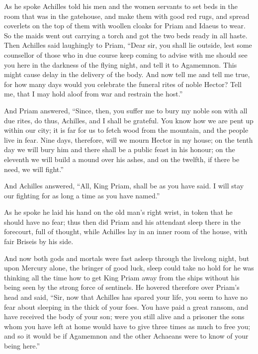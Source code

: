 As he spoke Achilles told his men and the women servants to set beds in
the room that was in the gatehouse, and make them with good red rugs, and
spread coverlets on the top of them with woollen cloaks for Priam and
Idaeus to wear. So the maids went out carrying a torch and got the two
beds ready in all haste. Then Achilles said laughingly to Priam, “Dear
sir, you shall lie outside, lest some counsellor of those who in due
course keep coming to advise with me should see you here in the darkness
of the flying night, and tell it to Agamemnon. This might cause delay in
the delivery of the body. And now tell me and tell me true, for how many
days would you celebrate the funeral rites of noble Hector? Tell me, that
I may hold aloof from war and restrain the host.”

And Priam answered, “Since, then, you suffer me to bury my noble son with
all due rites, do thus, Achilles, and I shall be grateful. You know how we
are pent up within our city; it is far for us to fetch wood from the
mountain, and the people live in fear. Nine days, therefore, will we mourn
Hector in my house; on the tenth day we will bury him and there shall be a
public feast in his honour; on the eleventh we will build a mound over his
ashes, and on the twelfth, if there be need, we will fight.”

And Achilles answered, “All, King Priam, shall be as you have said. I will
stay our fighting for as long a time as you have named.”

As he spoke he laid his hand on the old man’s right wrist, in token that
he should have no fear; thus then did Priam and his attendant sleep there
in the forecourt, full of thought, while Achilles lay in an inner room of
the house, with fair Briseis by his side.

And now both gods and mortals were fast asleep through the livelong night,
but upon Mercury alone, the bringer of good luck, sleep could take no hold
for he was thinking all the time how to get King Priam away from the ships
without his being seen by the strong force of sentinels. He hovered
therefore over Priam’s head and said, “Sir, now that Achilles has spared
your life, you seem to have no fear about sleeping in the thick of your
foes. You have paid a great ransom, and have received the body of your
son; were you still alive and a prisoner the sons whom you have left at
home would have to give three times as much to free you; and so it would
be if Agamemnon and the other Achaeans were to know of your being here.”

